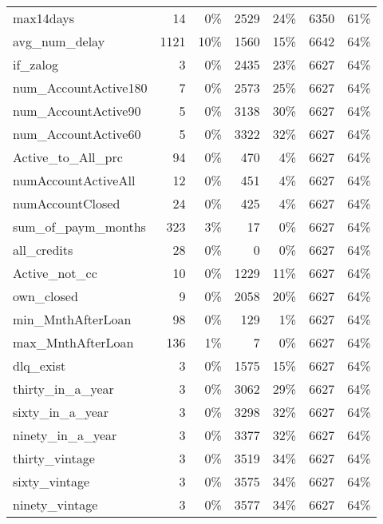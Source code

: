 \documentclass[12pt,a4paper]{article}
\begin{document}
\begin{longtable}{l|rr|rr|rr}
    max14days                & 14    &   0\% & 2529  & 24\% & 6350 & 61\% \\
    avg\_num\_delay          & 1121  &  10\% & 1560  & 15\% & 6642 & 64\% \\
    if\_zalog                & 3     &   0\% & 2435  & 23\% & 6627 & 64\% \\
    num\_AccountActive180    & 7     &   0\% & 2573  & 25\% & 6627 & 64\% \\
    num\_AccountActive90     & 5     &   0\% & 3138  & 30\% & 6627 & 64\% \\
    num\_AccountActive60     & 5     &   0\% & 3322  & 32\% & 6627 & 64\% \\
    Active\_to\_All\_prc     & 94    &   0\% & 470   &  4\% & 6627 & 64\% \\
    numAccountActiveAll      & 12    &   0\% & 451   &  4\% & 6627 & 64\% \\
    numAccountClosed         & 24    &   0\% & 425   &  4\% & 6627 & 64\% \\
    sum\_of\_paym\_months    & 323   &   3\% & 17    &  0\% & 6627 & 64\% \\
    all\_credits             & 28    &   0\% & 0     &  0\% & 6627 & 64\% \\
    Active\_not\_cc          & 10    &   0\% & 1229  & 11\% & 6627 & 64\% \\
    own\_closed              & 9     &   0\% & 2058  & 20\% & 6627 & 64\% \\
    min\_MnthAfterLoan       & 98    &   0\% & 129   &  1\% & 6627 & 64\% \\
    max\_MnthAfterLoan       & 136   &   1\% & 7     &  0\% & 6627 & 64\% \\
    dlq\_exist               & 3     &   0\% & 1575  & 15\% & 6627 & 64\% \\
    thirty\_in\_a\_year      & 3     &   0\% & 3062  & 29\% & 6627 & 64\% \\
    sixty\_in\_a\_year       & 3     &   0\% & 3298  & 32\% & 6627 & 64\% \\
    ninety\_in\_a\_year      & 3     &   0\% & 3377  & 32\% & 6627 & 64\% \\
    thirty\_vintage          & 3     &   0\% & 3519  & 34\% & 6627 & 64\% \\
    sixty\_vintage           & 3     &   0\% & 3575  & 34\% & 6627 & 64\% \\
    ninety\_vintage          & 3     &   0\% & 3577  & 34\% & 6627 & 64\% \\
  \end{longtable}
\end{document}
